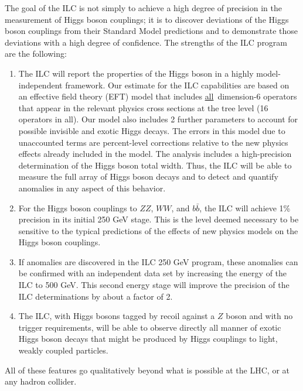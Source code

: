 The goal of the ILC is not simply to achieve a high degree of
precision in the measurement of Higgs boson couplings; it is to
discover deviations of the Higgs boson couplings from their Standard
Model predictions and to demonstrate those deviations with a high
degree of confidence.  The strengths of the ILC program are the
 following:
\begin{enumerate}
\item The ILC will report the properties of the Higgs boson in a
  highly model-independent framework.   Our estimate for the ILC capabilities
  are based on an effective field theory (EFT) model that includes
 {\underline{all}}\ dimension-6 operators that appear in the relevant physics
  cross sections at the tree level  (16 operators in all).   Our model
  also includes 2 further parameters to account for possible invisible
  and exotic Higgs decays.  The errors in this model due to
  unaccounted terms are percent-level corrections relative to the new
  physics effects already included in the model.   The analysis includes a
  high-precision determination of the Higgs boson total width. 
 Thus, the ILC will be able to measure  the full array of Higgs 
boson decays and to detect and quantify anomalies in any aspect of this behavior.
\item  For the Higgs boson couplings to $ZZ$, $WW$, and $b\bar b$, 
the ILC will achieve 1\% precision in its initial 250 GeV
  stage.   This is the
 level deemed necessary to be sensitive to the typical predictions 
of the effects of new physics models on the Higgs boson couplings.
\item  If  anomalies are  discovered in the ILC 
250 GeV program, these
  anomalies can be confirmed with an independent data set by
  increasing the energy of the ILC to 500 GeV.   This second energy
  stage will improve the precision of the ILC 
determinations by about a factor of 2.  
\item The ILC, with Higgs bosons tagged by recoil against a $Z$ boson
  and with no trigger requirements, will be able to observe directly
  all manner of exotic Higgs boson decays that might be produced by
Higgs couplings  to  light, weakly coupled  particles.
\end{enumerate}
All of these features go qualitatively beyond what is possible at the 
LHC, or at any hadron collider.

